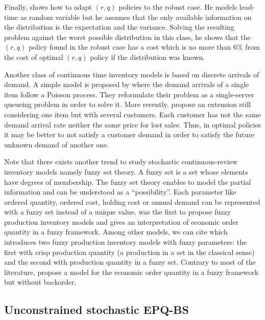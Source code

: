 Finally, \citet{Gallego1998} shows how to adapt $(r,q)$ policies to the robust case.
He models lead-time as random variable but he assumes that the only available information on the distribution is the expectation and the variance.
Solving the resulting problem against the worst possible distribution in this class, he shows that the $(r,q)$ policy found in the robust case has a cost which is no more than 6\% from the cost of optimal $(r,q)$ policy if the distribution was known.


\medskip


Another class of continuous time inventory models is based on discrete arrivals of demand.
A simple model is proposed by \citet{Gavish1980} where the demand arrivals of a single item follow a Poisson process.
They reformulate their problem as a single-server queueing problem in order to solve it.
More recently, \citet{Gayon2009} propose an extension still considering one item but with several customers.
Each customer has not the same demand arrival rate neither the same price for lost sales.
Thus, in optimal policies it may be better to not satisfy a customer demand in order to satisfy the future unknown demand of another one.


\medskip


Note that there exists another trend to study stochastic continuous-review inventory models namely fuzzy set theory.
A fuzzy set is a set whose elements have degrees of membership.
The fuzzy set theory enables to model the partial information and can be understood as a ``possibility''.
Each parameter like ordered quantity, ordered cost, holding cost or annual demand can be represented with a fuzzy set instead of a unique value.
\citet{Park1987} was the first to propose fuzzy production inventory models and gives an interpretation of economic order quantity in a fuzzy framework.
Among other models, we can cite \citet{Hsieh2002} which introduces two fuzzy production inventory models with fuzzy parameters: the first with crisp production quantity (\ie a production in a set in the classical sense) and the second with production quantity in a fuzzy set.
Contrary to most of the literature, \citet{Lee1999} propose a model for the economic order quantity in a fuzzy framework but without backorder.


\subsection{Unconstrained stochastic EPQ-BS}


